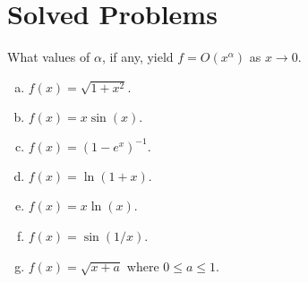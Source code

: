 \section{Solved Problems}
\begin{problem}
	What values of $ \alpha $, if any, yield $ f = O(x^\alpha) $ as $ x \to 0 $.
	\begin{enumerate}[(a),noitemsep]
		\item $ f(x) = \sqrt{1 + x^2}. $
		\item $ f(x) = x \sin(x). $
		\item $ f(x) = (1-e^x)^{-1}. $
		\item $ f(x) = \ln(1+x) $.
		\item $ f(x) = x\ln(x) $.
		\item $ f(x) = \sin(1/x) $.
		\item $ f(x) = \sqrt{x + a} $ where $ 0\leq a \leq 1 $.
	\end{enumerate}
\end{problem}
